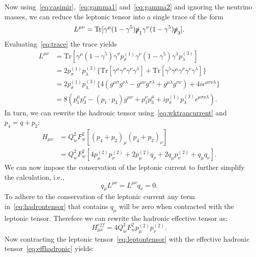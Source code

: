 Now using~\eqref{eq:casimir},~\eqref{eq:gamma1} and~\eqref{eq:gamma2} and ignoring the neutrino masses, we can reduce the leptonic tensor into a single trace of the form
\begin{equation}\label{eq:trace}
L^{\mu \nu}= \mathrm{Tr}[\gamma ^{\mu}(1-\gamma ^5) \slashed{p}_1\gamma ^{\nu}(1-\gamma ^5)\slashed{p}_3].
\end{equation}
Evaluating~\eqref{eq:trace} the trace yields
\begin{align}
L^{\mu \nu} &= \mathrm{Tr}[\gamma ^{\mu}(1-\gamma ^5) \gamma ^{\sigma} p_{\sigma}^{(1)}\gamma ^{\nu}(1-\gamma ^5)\gamma ^{\lambda} p_{\lambda}^{(3)}] \nonumber 
\\
&= 2 p_{\sigma}^{(1)} p_{\lambda}^{(3)}\{ \mathrm{Tr}[\gamma ^{\mu}\gamma ^{\sigma}\gamma ^{\nu}\gamma ^{\lambda}]+\mathrm{Tr}[\gamma ^5 \gamma ^{\mu}\gamma ^{\sigma}\gamma ^{\nu}\gamma ^{\lambda}]\} \nonumber
\\
&= 2 p_{\sigma}^{(1)} p_{\lambda}^{(3)}\{ 4(g^{\mu \sigma}g^{\nu \lambda} - g^{\mu \nu}g^{\sigma \lambda} + g^{\mu \lambda}g^{\sigma \nu})+4i\epsilon^{\mu \sigma \nu \lambda}\}\nonumber
\\
&= 8 \left( p_1^{\mu}p_3^{\nu}-(p_1\cdot p_3) g^{\mu \nu}+p_1^{\nu}p_3^{\mu} +i p_{\sigma}^{(1)} p_{\lambda}^{(3)} \epsilon ^{\mu \sigma \nu \lambda} \right). \label{eq:leptontensor}
\end{align}
In turn, we can rewrite the hadronic tensor using~\eqref{eq:wktrancurrent} and $p_4=q+p_2$:
\begin{align}
H_{\mu \nu} &= Q_{w}^2 F_{w}^2[(p_4+p_2)_{\mu}(p_4+p_2)_{\nu}] \nonumber \\
&= Q_{w}^2 F_{w}^2[4p_{\mu}^{(2)}p_{\nu}^{(2)}+2p_{\mu}^{(2)}q_{\nu}+2q_{\mu}p_{\nu}^{(2)} +q_{\mu}q_{\nu}].\label{eq:hadrontensor}
\end{align}
We can now impose the conservation of the leptonic current to further simplify the calculation, i.e.,
\begin{equation}
q_{\mu}L^{\mu \nu} = L^{\mu \nu}q_{\nu}=0.
\end{equation}
To adhere to the conservation of the leptonic current any term in~\eqref{eq:hadrontensor} that contains $q_{\mu}$ will be zero when contracted with the leptonic tensor. Therefore we can rewrite the hadronic effective tensor as:
\begin{equation}\label{eq:effhadronic}
H_{\mu \nu}^{eff}=4Q_{w}^2 F_{w}^2 p_{\mu}^{(2)}p_{\nu}^{(2)}.
\end{equation}
Now contracting the leptonic tensor~\eqref{eq:leptontensor} with the effective hadronic tensor~\eqref{eq:effhadronic} yields:

